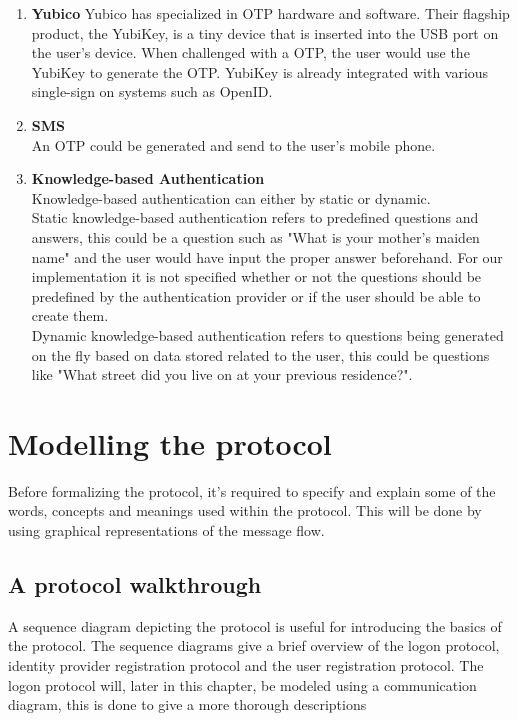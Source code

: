 \documentclass[twosided]{report}
\begin{document}
\begin{enumerate}
	\item[] \textbf{Yubico}
		Yubico has specialized in OTP hardware and software. Their flagship product, the YubiKey, is a tiny device that is inserted into the USB port on the user's device. When challenged with a OTP, the user would use the YubiKey to generate the OTP. YubiKey is already integrated with various single-sign on systems such as OpenID.
	\item[] \textbf{SMS}\\
		An OTP could be generated and send to the user's mobile phone.
	\item[] \textbf{Knowledge-based Authentication}\\
		Knowledge-based authentication can either by static or dynamic.\\
		Static knowledge-based authentication refers to predefined questions and answers, this could be a question such as "What is your mother's maiden name" and the user would have input the proper answer beforehand. For our implementation it is not specified whether or not the questions should be predefined by the authentication provider or if the user should be able to create them.\\
		Dynamic knowledge-based authentication refers to questions being generated on the fly based on data stored related to the user, this could be questions like "What street did you live on at your previous residence?". 
\end{enumerate}

\chapter{Modelling the protocol}
\label{chap:modelspecify}
Before formalizing the protocol, it's required to specify and explain some of the words, concepts and meanings used within the protocol. This will be done by using graphical representations of the message flow.

\section{A protocol walkthrough}
A sequence diagram depicting the protocol is useful for introducing the basics of the protocol. The sequence diagrams give a brief overview of the logon protocol, identity provider registration protocol and the user registration protocol. The logon protocol will, later in this chapter, be modeled using a communication diagram, this is done to give a more thorough descriptions
\end{document}
